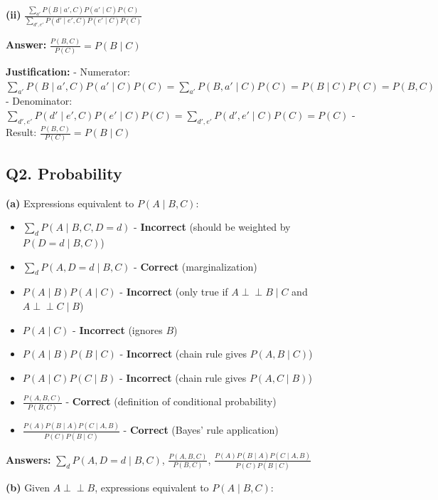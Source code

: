\documentclass[11pt]{article}
\begin{document}
\textbf{(ii)} $\frac{\sum_{a'} P(B \mid a', C) P(a' \mid C) P(C)}{\sum_{d', e'} P(d' \mid e', C) P(e' \mid C) P(C)}$

\textbf{Answer:} $\boxed{\frac{P(B, C)}{P(C)} = P(B \mid C)}$

\textbf{Justification:} 
- Numerator: $\sum_{a'} P(B \mid a', C) P(a' \mid C) P(C) = \sum_{a'} P(B, a' \mid C) P(C) = P(B \mid C) P(C) = P(B, C)$
- Denominator: $\sum_{d', e'} P(d' \mid e', C) P(e' \mid C) P(C) = \sum_{d', e'} P(d', e' \mid C) P(C) = P(C)$
- Result: $\frac{P(B, C)}{P(C)} = P(B \mid C)$

\subsection*{Q2. Probability}

\textbf{(a)} Expressions equivalent to $P(A \mid B, C)$:

\begin{itemize}
\item $\sum_d P(A \mid B, C, D = d)$ - \textbf{Incorrect} (should be weighted by $P(D = d \mid B, C)$)
\item $\sum_d P(A, D = d \mid B, C)$ - \textbf{Correct} (marginalization)
\item $P(A \mid B) P(A \mid C)$ - \textbf{Incorrect} (only true if $A \perp\!\!\!\perp B \mid C$ and $A \perp\!\!\!\perp C \mid B$)
\item $P(A \mid C)$ - \textbf{Incorrect} (ignores $B$)
\item $P(A \mid B) P(B \mid C)$ - \textbf{Incorrect} (chain rule gives $P(A, B \mid C)$)
\item $P(A \mid C) P(C \mid B)$ - \textbf{Incorrect} (chain rule gives $P(A, C \mid B)$)
\item $\frac{P(A, B, C)}{P(B, C)}$ - \textbf{Correct} (definition of conditional probability)
\item $\frac{P(A) P(B \mid A) P(C \mid A, B)}{P(C) P(B \mid C)}$ - \textbf{Correct} (Bayes' rule application)
\end{itemize}

\textbf{Answers:} $\boxed{\sum_d P(A, D = d \mid B, C)}$, $\boxed{\frac{P(A, B, C)}{P(B, C)}}$, $\boxed{\frac{P(A) P(B \mid A) P(C \mid A, B)}{P(C) P(B \mid C)}}$

\textbf{(b)} Given $A \perp\!\!\!\perp B$, expressions equivalent to $P(A \mid B, C)$:
\end{document}
